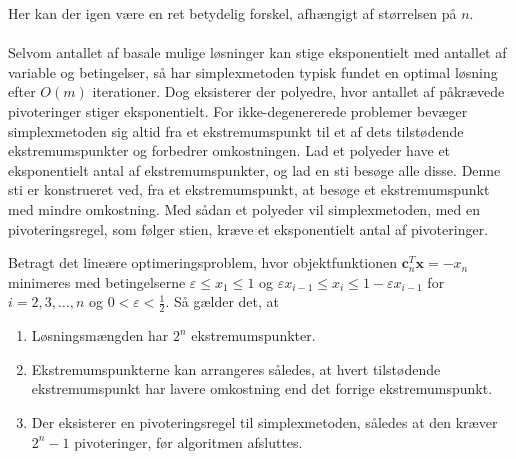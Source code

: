 Her kan der igen være en ret betydelig forskel, afhængigt af størrelsen på $n$.\\\\
%
Selvom antallet af basale mulige løsninger kan stige eksponentielt med antallet af variable og betingelser, så har simplexmetoden typisk fundet en optimal løsning efter $O(m)$ iterationer.
Dog eksisterer der polyedre, hvor antallet af påkrævede pivoteringer stiger eksponentielt.
For ikke-degenererede problemer bevæger simplexmetoden sig altid fra et ekstremumspunkt til et af dets tilstødende ekstremumspunkter og forbedrer omkostningen.
Lad et polyeder have et eksponentielt antal af ekstremumspunkter, og lad en sti besøge alle disse.
Denne sti er konstrueret ved, fra et ekstremumspunkt, at besøge et ekstremumspunkt med mindre omkostning.
Med sådan et polyeder vil simplexmetoden, med en pivoteringsregel, som følger stien, kræve et eksponentielt antal af pivoteringer.
\begin{thm}{}{}
Betragt det lineære optimeringsproblem, hvor objektfunktionen $\textbf{c}_n^T \textbf{x} = -x_n$ minimeres med betingelserne $\varepsilon \leq x_1 \leq 1$ og $\varepsilon x_{i-1} \leq x_i \leq 1 - \varepsilon x_{i-1}$ for $i = 2, 3, \ldots, n$ og $0 < \varepsilon < \frac{1}{2}$.
Så gælder det, at
%
\begin{enumerate}[label=(\alph*)]
\item Løsningsmængden har $2^n$ ekstremumspunkter.
\item Ekstremumspunkterne kan arrangeres således, at hvert tilstødende ekstremumspunkt har lavere omkostning end det forrige ekstremumspunkt.
\item Der eksisterer en pivoteringsregel til simplexmetoden, således at den kræver $2^n-1$ pivoteringer, før algoritmen afsluttes.
\end{enumerate}
%
\end{thm}
%
